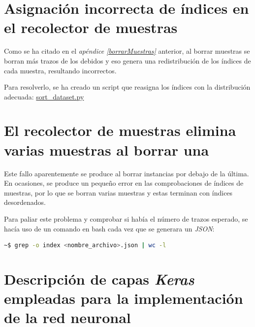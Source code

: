 \begin{appendices}
\section{Asignación incorrecta de índices en el recolector de muestras\label{borraIndices}}
Como se ha citado en el \textit{apéndice \ref{borrarMuestras}} anterior,
al borrar muestras se borran más trazos de los debidos y eso genera
una redistribución de los índices de cada muestra, resultando incorrectos.

Para resolverlo, se ha creado un script que reasigna los índices con
la distribución adecuada: 
\href{https://github.com/AntonioPriego/SmartPen/blob/main/Utils/sort_dataset.py}{sort\_dataset.py}


\section{El recolector de muestras elimina varias muestras al borrar una\label{borrarMuestras}}
Este fallo aparentemente se produce al borrar instancias por debajo de
la última. En ocasiones, se produce un pequeño error en las comprobaciones
de índices de muestras, por lo que se borran varias muestras y estas terminan
con índices desordenados.

Para paliar este problema y comprobar si había el número de trazos esperado,
se hacía uso de un comando en bash cada vez que se generara un \textit{JSON}:

\begin{lstlisting}[language=bash]
    ~$ grep -o index <nombre_archivo>.json | wc -l
\end{lstlisting}


\section{Descripción de capas \textit{Keras} empleadas para la implementación
de la red neuronal\label{capasKeras}}


\end{appendices}
